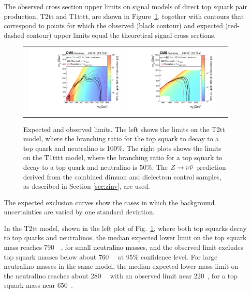 
The observed cross section upper limits on signal models of direct top squark pair production, T2tt and T1tttt, are shown in Figure~\ref{fig:fulllimit_T2tt_T1tttt}, together with contours that correspond to points for which the observed (black contour) and expected (red-dashed contour) upper limits equal the theoretical signal cross sections.
\begin{figure}[htbp]
  \begin{center}
  \begin{tabular}{cc}
\hspace{-1.5cm}
  \includegraphics[angle=0,width=0.48\textwidth]{figures/SusySearches/HadStop2015/BR_1p00_Stop_OnlyXSEC.pdf}
  \includegraphics[angle=0,width=0.48\textwidth]{figures/SusySearches/HadStop2015/zinv_improvement_BR_1p00_Gluino_OnlyXSEC.pdf}
  \end{tabular}
  \caption{Expected and observed limits. The left shows the limits on the T2tt model, where the branching ratio for the top squark to decay to a top quark and neutralino is 100\%. The right plots shows the limits on the T1tttt model, where the branching ratio for a top squark to decay to a top quark and neutralino is 50\%. The $Z\rightarrow \nu\bar{\nu}$ prediction derived from the combined dimuon and dielectron control samples, as described in Section \ref{sec:zinv}, are used.}
    \label{fig:fulllimit_T2tt_T1tttt}
  \end{center}
\end{figure}

%
The expected exclusion curves show the cases in which the background uncertainties are varied by one standard deviation.

In the T2tt model, shown in the left plot of Fig.~\ref{fig:fulllimit_T2tt_T1tttt}, where both top squarks decay to top quarks and neutralinos, the median expected lower limit on the top squark mass reaches 790~\GeV~, for small neutralino masses, and the observed limit excludes top squark masses below about 760~\GeV~ at 95\% confidence level.  For large neutralino masses in the same model, the median expected lower mass limit on the neutralino reaches about 280~\GeV~ with an observed limit near 220~\GeV, for a top squark mass near 650~\GeV. 
